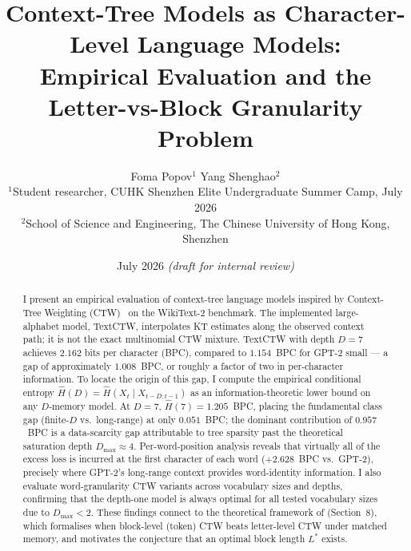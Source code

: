 \documentclass[11pt,a4paper]{article}
\newcommand{\bpcmin}{\widehat{H}}
\newcommand{\dmax}{D_{\max}}
\begin{document}
\title{\large\textbf{Context-Tree Models as Character-Level Language Models:\\
Empirical Evaluation and the Letter-vs-Block Granularity Problem}}

\author{                                                                                                                                           
Foma Popov$^{1}$ \quad Yang Shenghao$^{2}$\\[4pt]                                                                                                  
\small $^1$Student researcher, CUHK Shenzhen Elite Undergraduate Summer Camp, July 2026\\                                                          
\small $^2$School of Science and Engineering, The Chinese University of Hong Kong, Shenzhen                                                        
}                                                                                                                                                  

\date{July 2026 \quad \textit{(draft for internal review)}}

\maketitle
\thispagestyle{empty}

\begin{abstract}
I present an empirical evaluation of context-tree language models inspired by
Context-Tree Weighting (CTW)~\citep{WST95} on the WikiText-2 benchmark.
The implemented large-alphabet model, TextCTW, interpolates KT estimates along
the observed context path; it is not the exact multinomial CTW mixture.
TextCTW with depth $D=7$ achieves $2.162$ bits per character (BPC), compared to
$1.154$~BPC for GPT-2 small — a gap of approximately $1.008$~BPC,
or roughly a factor of two in per-character information.
To locate the origin of this gap, I compute the empirical conditional entropy
$\bpcmin(D) = \widehat{H}(X_t \mid X_{t-D:t-1})$ as an information-theoretic lower
bound on any $D$-memory model.
At $D=7$, $\bpcmin(7) = 1.205$~BPC, placing the fundamental class
gap (finite-$D$ vs.\ long-range) at only $0.051$~BPC; the dominant
contribution of $0.957$~BPC is a data-scarcity gap attributable to
tree sparsity past the theoretical saturation depth $\dmax \approx 4$.
Per-word-position analysis reveals that virtually all of the excess loss
is incurred at the first character of each word ($+2.628$~BPC vs.\ GPT-2),
precisely where GPT-2's long-range context provides word-identity information.
I also evaluate word-granularity CTW variants across vocabulary sizes and depths,
confirming that the depth-one model is always optimal for all tested vocabulary
sizes due to $\dmax < 2$.
These findings connect to the theoretical framework of
\citet{Willems2026} (Section~8), which formalises when block-level
(token) CTW beats letter-level CTW under matched memory, and motivates
the conjecture that an optimal block length $L^*$ exists.
\end{abstract}
\end{document}
